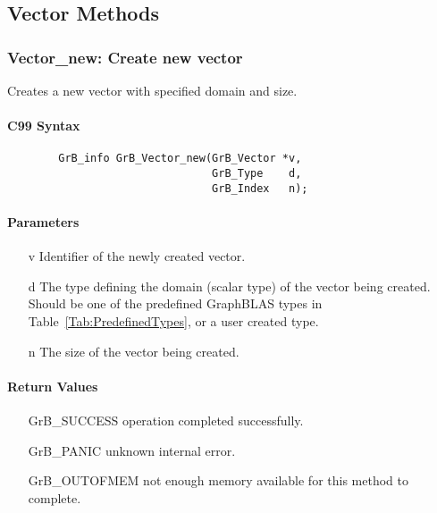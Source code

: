 \subsection{Vector Methods}



\subsubsection{{\sf Vector\_new}: Create new vector}

Creates a new vector with specified domain and size.

\paragraph{C99 Syntax}

\begin{verbatim}
        GrB_info GrB_Vector_new(GrB_Vector *v,
                                GrB_Type    d,
                                GrB_Index   n);
\end{verbatim}

\paragraph{Parameters}

\begin{itemize}[leftmargin=1.1in]
    \item[{\sf v}] Identifier of the newly created vector.
    \item[{\sf d}] The type defining the domain (scalar type) of the vector being created.
    Should be one of the predefined
    GraphBLAS types in Table~\ref{Tab:PredefinedTypes}, or a user created type.
    \item[{\sf n}] The size of the vector being created.  
\end{itemize}

\paragraph{Return Values}

\begin{itemize}[leftmargin=2.1in]
\item[{\sf GrB\_SUCCESS}]    operation completed successfully. \\
\item[{\sf GrB\_PANIC}]      unknown internal error. \\
\item[{\sf GrB\_OUTOFMEM}]   not enough memory available for this method to complete. \\
\end{itemize}

